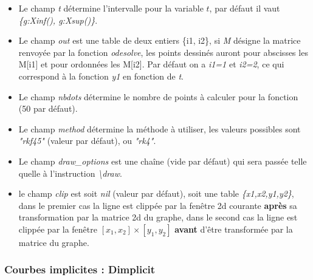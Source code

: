 \begin{itemize}
\begin{itemize}
      \begin{itemize}
        \item Le champ \emph{t} détermine l'intervalle pour la variable \(t\), par défaut il vaut \emph{\{g:Xinf(), g:Xsup()\}}.
        \item Le champ \emph{out} est une table de deux entiers \{i1, i2\}, si \emph{M} désigne la matrice renvoyée par la fonction \emph{odesolve}, les points dessinés auront pour abscisses les M{[}i1{]} et pour ordonnées les M{[}i2{]}. Par défaut on a \emph{i1=1} et \emph{i2=2}, ce qui correspond à la fonction \emph{y1} en fonction de \emph{t}.
        \item Le champ \emph{nbdots} détermine le nombre de points à calculer pour la fonction (50 par défaut).
        \item Le champ \emph{method} détermine la méthode à utiliser, les valeurs possibles sont \emph{"rkf45"} (valeur par défaut), ou \emph{"rk4"}.
        \item Le champ \emph{draw\_options} est une chaîne (vide par défaut) qui sera passée telle quelle à l'instruction \emph{\textbackslash draw}.
      \item le champ \emph{clip} est soit \emph{nil} (valeur par défaut), soit une table \emph{\{x1,x2,y1,y2\}}, dans le premier cas la ligne est clippée par la fenêtre 2d courante \textbf{après} sa transformation par la matrice 2d du graphe, dans le second cas la ligne est clippée par la fenêtre $[x_1,x_2]\times[y_1,y_2]$ \textbf{avant} d'être transformée par la matrice du graphe.

      \end{itemize}
  \end{itemize}
\end{itemize}

\subsubsection{Courbes implicites : Dimplicit}

